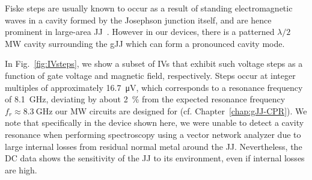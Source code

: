 Fiske steps are usually known to occur as a result of standing electromagnetic waves in a cavity formed by the Josephson junction itself, and are hence prominent in large-area JJ~\cite{krasnovFiskeStepsIntrinsic1999,kimFiskeStepsStudied2005,yabukiSupercurrentVanWaals2016b,liHighQualityEpitaxialMgB2017}.
%
However in our devices, there is a patterned $\lambda/2$ MW cavity surrounding the gJJ which can form a pronounced cavity mode.


In Fig.~\ref{fig:IVsteps}, we show a subset of IVs that exhibit such voltage steps as a function of gate voltage and magnetic field, respectively.
%
Steps occur at integer multiples of approximately \SI{16.7}{\micro\volt}, which corresponds to a resonance frequency of \SI{8.1}{\giga\hertz}, deviating by about \SI{2}{\percent} from the expected resonance frequency $f_r\approx\SI{8.3}{\giga\hertz}$ our MW circuits are designed for (cf. Chapter~\ref{chap:gJJ-CPR}).
%
We note that specifically in the device shown here, we were unable to detect a cavity resonance when performing spectroscopy using a vector network analyzer due to large internal losses from residual normal metal around the JJ.
%
Nevertheless, the DC data shows the sensitivity of the JJ to its environment, even if internal losses are high.

